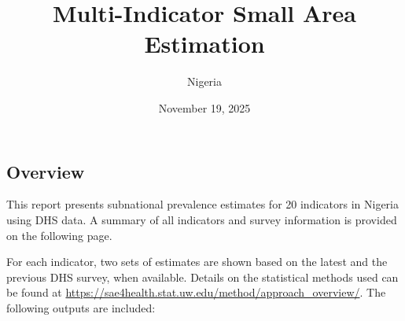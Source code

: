 \documentclass[
]{article}
\title{Multi-Indicator Small Area Estimation}
\subtitle{Nigeria}
\author{}
\date{\vspace{-2.5em}November 19, 2025}
\begin{document}
\maketitle

{
\setcounter{tocdepth}{2}
\tableofcontents
}
\clearpage

\subsection{Overview}\label{overview}

This report presents subnational prevalence estimates for 20 indicators in Nigeria using DHS data. A summary of all indicators and survey information is provided on the following page.

For each indicator, two sets of estimates are shown based on the latest and the previous DHS survey, when available. Details on the statistical methods used can be found at \url{https://sae4health.stat.uw.edu/method/approach_overview/}. The following outputs are included:
\end{document}
